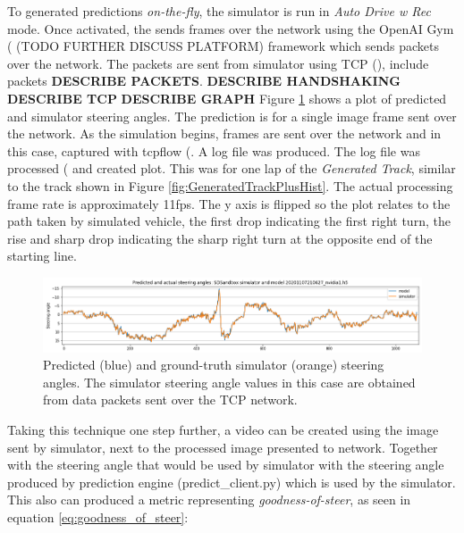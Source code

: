 To generated predictions \textit{on-the-fly}, the simulator is run in \textit{Auto Drive w Rec} mode. Once activated, the sends frames over the network using the OpenAI Gym (\cite{brockman2016openai} (TODO FURTHER DISCUSS PLATFORM) framework which sends packets over the network. The packets are sent from simulator using TCP (\cite{rfc793}), include packets \textbf{DESCRIBE PACKETS}.  
\textbf{DESCRIBE HANDSHAKING} \textbf{DESCRIBE TCP} 
\textbf{DESCRIBE GRAPH}
Figure \ref{fig:PredSteeringAnglestcpflowNvidia1} shows a plot of predicted and simulator steering angles. The prediction is for a single image frame sent over the network. As the simulation begins, frames are sent over the network and in this case, captured with tcpflow (\cite{garfinkel2013passive}. A log file was produced. The log file was processed (\cite{JUPYTERNOTEBOOKINAPPENDIX} and created plot. This was for one lap of the \textit{Generated Track}, similar to the track shown in Figure \ref{fig:GeneratedTrackPlusHist}. The actual processing frame rate is approximately 11fps. The y axis is flipped so the plot relates to the path taken by simulated vehicle, the first drop indicating the first right turn, the rise and sharp drop indicating the sharp right turn at the opposite end of the starting line.

\begin{figure}[ht]
 \centering 
 \includegraphics[width=\textwidth]{Figures/PredSteeringAnglestcpflowNvidia1.png}
 \caption{Predicted (blue) and ground-truth simulator (orange) steering angles. The simulator steering angle values in this case are obtained from data packets sent over the TCP network.}
 \label{fig:PredSteeringAnglestcpflowNvidia1}
\end{figure}

Taking this technique one step further, a video can be created using the image sent by simulator, next to the processed image presented to network. Together with the steering angle that would be used by simulator with the steering angle produced by prediction engine (predict\_client.py) which is used by the simulator.
This also can produced a metric representing \textit{goodness-of-steer}, as seen in equation     \ref{eq:goodness_of_steer}:


